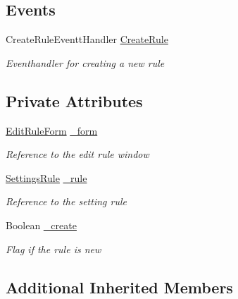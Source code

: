 \subsection*{Events}
\begin{DoxyCompactItemize}
\item 
Create\+Rule\+Eventt\+Handler \hyperlink{class_web_analyzer_1_1_u_i_1_1_interaction_objects_1_1_rule_control_a7bf67a13195858fc69b81997bb629ec5}{Create\+Rule}
\begin{DoxyCompactList}\small\item\em Eventhandler for creating a new rule \end{DoxyCompactList}\end{DoxyCompactItemize}
\subsection*{Private Attributes}
\begin{DoxyCompactItemize}
\item 
\hyperlink{class_web_analyzer_1_1_u_i_1_1_edit_rule_form}{Edit\+Rule\+Form} \hyperlink{class_web_analyzer_1_1_u_i_1_1_interaction_objects_1_1_rule_control_a438aa401b03c23242fce60f06efb3b48}{\+\_\+form}
\begin{DoxyCompactList}\small\item\em Reference to the edit rule window \end{DoxyCompactList}\item 
\hyperlink{class_web_analyzer_1_1_models_1_1_settings_model_1_1_settings_rule}{Settings\+Rule} \hyperlink{class_web_analyzer_1_1_u_i_1_1_interaction_objects_1_1_rule_control_aa89ec17ff2fc96e2868147d3a1bfe474}{\+\_\+rule}
\begin{DoxyCompactList}\small\item\em Reference to the setting rule \end{DoxyCompactList}\item 
Boolean \hyperlink{class_web_analyzer_1_1_u_i_1_1_interaction_objects_1_1_rule_control_af8af0b3b5216da52d2173d358c1f8928}{\+\_\+create}
\begin{DoxyCompactList}\small\item\em Flag if the rule is new \end{DoxyCompactList}\end{DoxyCompactItemize}
\subsection*{Additional Inherited Members}


